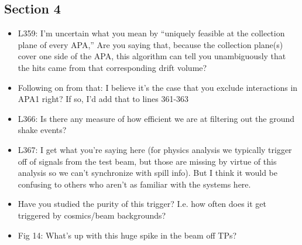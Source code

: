 \documentclass[11pt]{article}
\begin{document}
\subsection{Section 4}
\begin{itemize}
    \item L359: I’m uncertain what you mean by “uniquely feasible at the collection plane of every APA,” Are you saying that, because the collection plane(s) cover one side of the APA, this algorithm can tell you unambiguously that the hits came from that corresponding drift volume?
    \item Following on from that: I believe it’s the case that you exclude interactions in APA1 right? If so, I’d add that to lines 361-363
    \item L366: Is there any measure of how efficient we are at filtering out the ground shake events?
    \item L367: I get what you’re saying here (for physics analysis we typically trigger off of signals from the test beam, but those are missing by virtue of this analysis so we can’t synchronize with spill info). But I think it would be confusing to others who aren’t as familiar with the systems here.
    \item Have you studied the purity of this trigger? I.e. how often does it get triggered by cosmics/beam backgrounds?
    \item Fig 14: What’s up with this huge spike in the beam off TPs?
\end{itemize}
\end{document}
